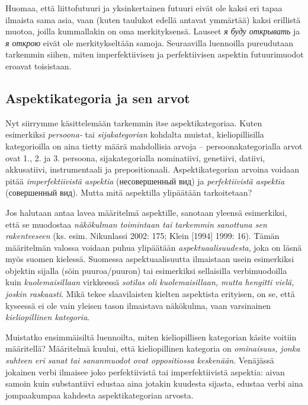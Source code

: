 \documentclass[]{scrartcl}
\begin{document}
Huomaa, että liittofutuuri ja yksinkertainen futuuri eivät ole kaksi eri
tapaa ilmaista sama asia, vaan (kuten taulukot edellä antavat ymmärtää)
kaksi erillistä muotoa, joilla kummallakin on oma merkityksensä. Lauseet
\emph{я буду открывать} ja \emph{я открою} eivät ole merkitykseltään
samoja. Seuraavilla luennoilla pureudutaan tarkemmin siihen, miten
imperfektiivisen ja perfektiivisen aspektin futuurimuodot eroavat
toisistaan.

\subsection{Aspektikategoria ja sen
arvot}\label{aspektikategoria-ja-sen-arvot}

Nyt siirrymme käsittelemään tarkemmin itse aspektikategoriaa. Kuten
esimerkiksi \emph{persoona-} tai \emph{sijakategorian} kohdalta muistat,
kieliopillisilla kategorioilla on aina tietty määrä mahdollisia arvoja
-- persoonakategorialla arvot ovat 1., 2. ja 3. persoona,
sijakategorialla nominatiivi, genetiivi, datiivi, akkusatiivi,
instrumentaali ja prepositionaali. Aspektikategorian arvoina voidaan
pitää \emph{imperfektiivistä aspektia} (несовершенный вид) ja
\emph{perfektiivistä aspektia} (совершенный вид). Mutta mitä aspektilla
ylipäätään tarkoitetaan?

Jos halutaan antaa lavea määritelmä aspektille, sanotaan yleensä
esimerkiksi, että se muodostaa \emph{näkökulman toimintaan tai tarkemmin
sanottuna sen rakenteeseen} (ks. esim. Nikunlassi 2002: 175; Klein
{[}1994{]} 1999: 16). Tämän määritelmän valossa voidaan puhua ylipäätään
\emph{aspektuaalisuudesta}, joka on läsnä myös suomen kielessä. Suomessa
aspektuaalisuutta ilmaistaan usein esimerkiksi objektin sijalla (söin
puuroa/puuron) tai esimerkiksi sellaisilla verbimuodoilla kuin
\emph{kuolemaisillaan} virkkeessä \emph{sotilas oli kuolemaisillaan,
mutta hengitti vielä, joskin raskaasti}. Mikä tekee slaavilaisten
kielten aspektista erityisen, on se, että kyseessä ei ole vain yleisen
tason ilmaistava näkökulma, vaan varsinainen \emph{kieliopillinen
kategoria}.

Muistatko ensimmäisiltä luennoilta, miten kieliopillisen kategorian
käsite voitiin määritellä? Määritelmä kuului, että kieliopillinen
kategoria on \emph{ominaisuus, jonka suhteen eri sanat tai sananmuodot
ovat oppositiossa keskenään}. Venäjässä jokainen verbi ilmaisee joko
perfektiivistä tai imperfektiivistä aspektia: aivan samoin kuin
substantiivi edustaa aina jotakin kuudesta sijasta, edustaa verbi aina
jompaakumpaa kahdesta aspektikategorian arvosta.
\end{document}
